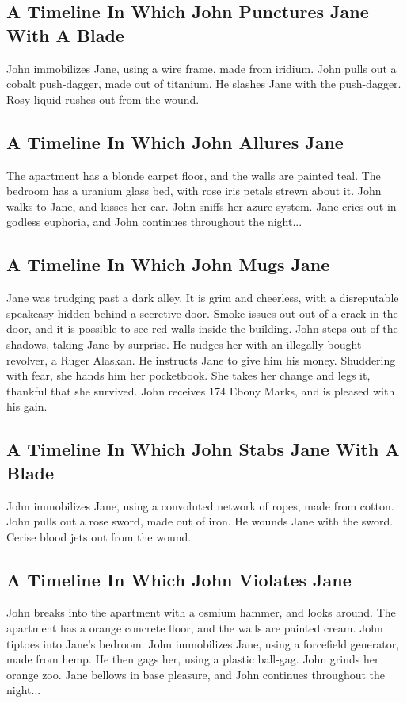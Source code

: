 \documentclass{article}
\begin{document}
\subsection{A Timeline In Which John Punctures Jane With A Blade}


John immobilizes Jane, using a wire frame, made from iridium.
John pulls out a cobalt push{-}dagger, made out of titanium.
He slashes Jane with the push{-}dagger.
Rosy liquid rushes out from the wound.
\subsection{A Timeline In Which John Allures Jane}


The apartment has a blonde carpet floor, and the walls are painted teal.
The bedroom has a uranium glass bed, with rose iris petals strewn about it.
John walks to Jane, and kisses her ear.
John sniffs her azure system.
Jane cries out in godless euphoria, and John continues throughout the night...
\subsection{A Timeline In Which John Mugs Jane}


Jane was trudging past a dark alley.
It is grim and cheerless, with a disreputable speakeasy hidden behind a secretive door.
Smoke issues out out of a crack in the door, and it is possible to see red walls inside the building.
John steps out of the shadows, taking Jane by surprise.
He nudges her with an illegally bought revolver, a Ruger Alaskan.
He instructs Jane to give him his money.
Shuddering with fear, she hands him her pocketbook.
She takes her change and legs it, thankful that she survived.
John receives 174 Ebony Marks, and is pleased with his gain.
\subsection{A Timeline In Which John Stabs Jane With A Blade}


John immobilizes Jane, using a convoluted network of ropes, made from cotton.
John pulls out a rose sword, made out of iron.
He wounds Jane with the sword.
Cerise blood jets out from the wound.
\subsection{A Timeline In Which John Violates Jane}


John breaks into the apartment with a osmium hammer, and looks around.
The apartment has a orange concrete floor, and the walls are painted cream.
John tiptoes into Jane's bedroom.
John immobilizes Jane, using a forcefield generator, made from hemp.
He then gags her, using a plastic ball{-}gag.
John grinds her orange zoo.
Jane bellows in base pleasure, and John continues throughout the night...
\end{document}
